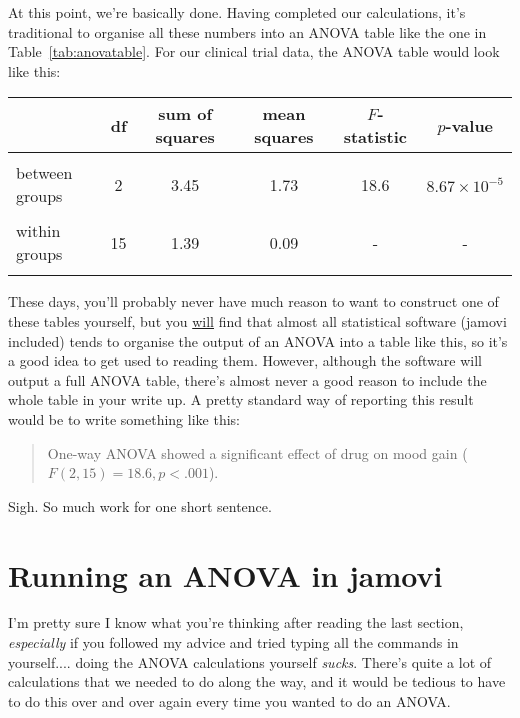 At this point, we're basically done. Having completed our calculations, it's traditional to organise all these numbers into an ANOVA table like the one in Table~\ref{tab:anovatable}. For our clinical trial data, the ANOVA table would look like this:
\begin{center}
\begin{tabular}{l|ccccc} 
& df & sum of squares & mean squares & $F$-statistic & $p$-value \\  \hline \\ 
between groups & 2 & 3.45 & 1.73 & 18.6 & $8.67 \times 10^{-5}$ \\ \\
within groups   & 15 & 1.39 & 0.09 & - & - \\ \\ 
\end{tabular}
\end{center}
\noindent
These days, you'll probably never have much reason to want to construct one of these tables yourself, but you \underline{will} find that almost all statistical software (jamovi included) tends to organise the output of an ANOVA into a table like this, so it's a good idea to get used to reading them. However, although the software will output a full ANOVA table, there's almost never a good reason to include the whole table in your write up. A pretty standard way of reporting this result would be to write something like this:
\begin{quote}
One-way ANOVA showed a significant effect of drug on mood gain ($F(2,15) = 18.6, p<.001$).
\end{quote}
Sigh. So much work for one short sentence.


\section{Running an ANOVA in jamovi\label{sec:introduceaov}}

I'm pretty sure I know what you're thinking after reading the last section, {\it especially} if you followed my advice and tried typing all the commands in yourself.... doing the ANOVA calculations yourself {\it sucks}. There's quite a lot of calculations that we needed to do along the way, and it would be tedious to have to do this over and over again every time you wanted to do an ANOVA. 







